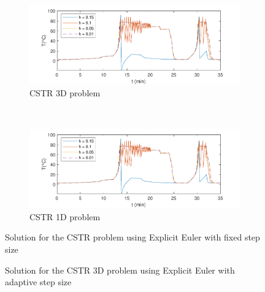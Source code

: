 \begin{figure}[H]
\centering
    \begin{subfigure}{0.8\linewidth}
        \centering
        \includegraphics[width=1\linewidth]{images/2/2_5_3D_hs.pdf} 
        \caption{CSTR 3D problem}
    \end{subfigure} \\
    \begin{subfigure}{0.8\linewidth}
        \centering
        \includegraphics[width=1\linewidth]{images/2/2_5_1D_hs.pdf}
        \caption{CSTR 1D problem}
    \end{subfigure}
    \caption{Solution for the CSTR problem using Explicit Euler with fixed step size}
    \label{2_5_3D_1D_hs}
\end{figure}

\begin{figure}[H]
    \centering
    \caption{Solution for the CSTR 3D problem using Explicit Euler with adaptive step size}
    \label{2_5_3D_tols}
\end{figure}

